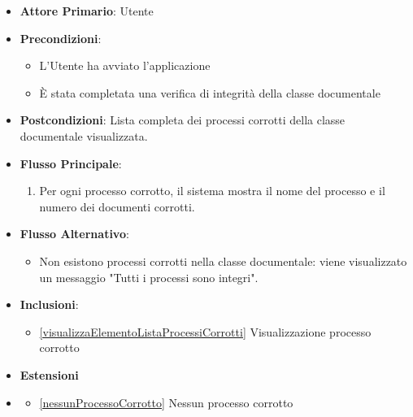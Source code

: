 \begin{itemize}
    \item \textbf{Attore Primario}: Utente
    \item \textbf{Precondizioni}: 
        \begin{itemize}
            \item L'Utente ha avviato l'applicazione
            \item È stata completata una verifica di integrità della classe documentale
        \end{itemize}      
    \item \textbf{Postcondizioni}: Lista completa dei processi corrotti della classe documentale visualizzata.     
    \item \textbf{Flusso Principale}:
        \begin{enumerate}
            \item Per ogni processo corrotto, il sistema mostra il nome del processo e il numero dei documenti corrotti.
        \end{enumerate}
    \item \textbf{Flusso Alternativo}:
        \begin{itemize}
            \item Non esistono processi corrotti nella classe documentale: viene visualizzato un messaggio "Tutti i processi sono integri".
        \end{itemize}
    \item \textbf{Inclusioni}: \begin{itemize}
        \item \ref{visualizzaElementoListaProcessiCorrotti} Visualizzazione processo corrotto
        \end{itemize}
    \item \textbf{Estensioni}
    \item \begin{itemize}
        \item \ref{nessunProcessoCorrotto} Nessun processo corrotto
    \end{itemize}
\end{itemize}


